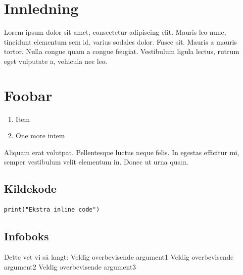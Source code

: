 
\section{Innledning}
Lorem ipsum dolor sit amet, consectetur adipiscing elit. Mauris leo nunc, tincidunt elementum sem id, varius sodales dolor. Fusce sit.
Mauris a mauris tortor. Nulla congue quam a congue feugiat. Vestibulum ligula lectus, rutrum eget vulputate a, vehicula nec leo.

\section{Foobar}
\begin{enumerate}
\item Item
\item One more intem
\end{enumerate}

Aliquam erat volutpat. Pellentesque luctus neque felis. In egestas efficitur mi, semper vestibulum velit elementum in. Donec ut urna quam.

\subsection{Kildekode}
\begin{lstlisting}[caption={Inline Programkode}, label=Kodesnutt_1, style=Python]
print("Ekstra inline code")
\end{lstlisting}




\subsection{Infoboks}
\begin{infoboks}{Dette vet vi så langt:}
Veldig overbevisende argument1
Veldig overbevisende argument2
Veldig overbevisende argument3
\end{infoboks}


